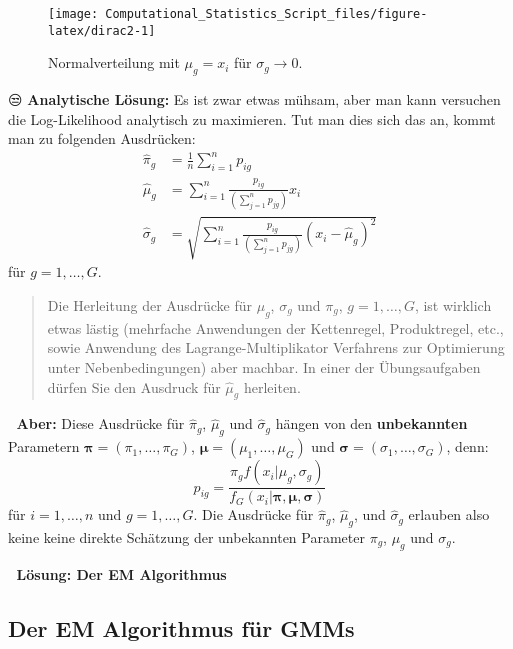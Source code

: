 \documentclass[
  ngerman,
]{book}
\begin{document}
\begin{figure}[h]

{\centering \texttt{[image: Computational\_Statistics\_Script\_files/figure-latex/dirac2-1]} 

}

\caption{Normalverteilung mit $\mu_g=x_i$ für $\sigma_g\to 0$.}\label{fig:dirac2}
\end{figure}

😒 \textbf{Analytische Lösung:} Es ist zwar etwas mühsam, aber man kann versuchen die Log-Likelihood analytisch zu maximieren. Tut man dies sich das an, kommt man zu folgenden Ausdrücken:
\begin{align*}
\hat\pi_g&=\frac{1}{n}\sum_{i=1}^np_{ig}\\
\hat\mu_g&=\sum_{i=1}^n\frac{p_{ig}}{\left(\sum_{j=1}^np_{jg}\right)}x_i\\
\hat\sigma_g&=\sqrt{\sum_{i=1}^n\frac{p_{ig}}{\left(\sum_{j=1}^np_{jg}\right)}\left(x_i-\hat\mu_g\right)^2}
\end{align*}
für \(g=1,\dots,G\).

\begin{quote}
Die Herleitung der Ausdrücke für \(\mu_g\), \(\sigma_g\) und \(\pi_g\), \(g=1,\dots,G\), ist wirklich etwas lästig (mehrfache Anwendungen der Kettenregel, Produktregel, etc., sowie Anwendung des Lagrange-Multiplikator Verfahrens zur Optimierung unter Nebenbedingungen) aber machbar. In einer der Übungsaufgaben dürfen Sie den Ausdruck für \(\hat\mu_g\) herleiten.
\end{quote}

🙈 {\textbf{Aber:}} Diese Ausdrücke für \(\hat\pi_g\), \(\hat\mu_g\) und \(\hat\sigma_g\) hängen von den {\textbf{unbekannten}} Parametern \(\boldsymbol{\pi}=(\pi_1,\dots,\pi_G)\), \(\boldsymbol{\mu}=(\mu_1,\dots,\mu_G)\) und \(\boldsymbol{\sigma}=(\sigma_1,\dots,\sigma_G)\), denn:
\[
p_{ig}=\frac{\pi_gf(x_i|\mu_g,\sigma_g)}{f_G(x_i|\boldsymbol{\pi},\boldsymbol{\mu},\boldsymbol{\sigma})}
\]
für \(i=1,\dots,n\) und \(g=1,\dots,G\). Die Ausdrücke für \(\hat\pi_g\), \(\hat\mu_g\), und \(\hat\sigma_g\) erlauben also keine keine direkte Schätzung der unbekannten Parameter \(\pi_g\), \(\mu_g\) und \(\sigma_g\).

🥳 {\textbf{Lösung: Der EM Algorithmus}}

\hypertarget{ch:EM1}{%
\subsection{Der EM Algorithmus für GMMs}\label{ch:EM1}}
\end{document}
